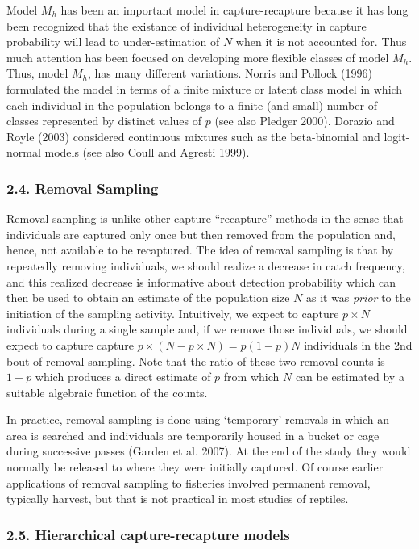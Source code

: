 \documentclass{book}
\begin{document}
Model $M_h$ has been an important model in capture-recapture because
it has long been recognized that the existance of individual
heterogeneity in capture probability will lead to under-estimation of
$N$ when it is not accounted for.  Thus much attention has been
focused on developing more flexible classes of model $M_h$.  Thus,
model $M_h$, has many different variations. Norris and Pollock (1996)
formulated the model in terms of a finite mixture or latent class
model in which each individual in the population belongs to a finite
(and small) number of classes represented by distinct values of $p$
(see also Pledger 2000). Dorazio and Royle (2003) considered
continuous mixtures such as the beta-binomial and logit-normal models
(see also Coull and Agresti 1999).

\subsubsection*{2.4. Removal Sampling}

Removal sampling is unlike other capture-``recapture'' methods in the
sense that individuals are captured only once but then removed from
the population and, hence, not available to be recaptured. The idea of
removal sampling is that by repeatedly removing individuals, we should
realize a decrease in catch frequency, and this realized decrease is
informative about detection probability which can then be used to
obtain an estimate of the population size $N$ as it was {\it prior} to
the initiation of the sampling activity. Intuitively, we expect to
capture $p \times N$ individuals during a single sample and, if we
remove those individuals, we should expect to capture capture $p
\times (N - p \times N) = p(1-p) N$ individuals in the 2nd bout of
removal sampling. Note that the ratio of these two removal counts is
$1-p$ which produces a direct estimate of $p$ from which $N$ can be
estimated by a suitable algebraic function of the counts.

In practice, removal sampling is done using `temporary' removals in
which an area is searched and individuals are temporarily housed in a
bucket or cage during successive passes (Garden et al. 2007). At the end of the study they
would normally be released to where they were initially captured. Of
course earlier applications of removal sampling to fisheries involved
permanent removal, typically harvest, but that is not practical in
most studies of reptiles.

\subsubsection*{2.5. Hierarchical capture-recapture models}
\end{document}
